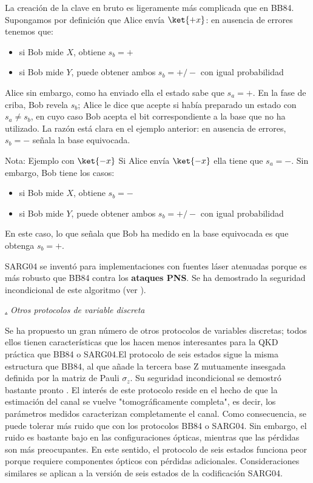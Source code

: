 \documentclass[a4paper,11pt]{book} %
\numberwithin{equation}{chapter}
\def\subsubiContadorIt{\par\addtocounter{subsubsection}{1}\underline{\it\thesubsubsection.}\hskip0.5cm \setcounter{subsubsubsectionIt}{0}}
\newcommand{\SubsubiIt}[1]{
		\subsubiContadorIt \textit{#1}
	}
\newcounter{subsubsubsectionIt}[subsubsection]
\begin{document}
La creación de la clave en bruto es ligeramente más complicada que en BB84. Supongamos por definición que Alice envía $\ket{+x}$: en ausencia de errores tenemos que:
\begin{itemize}
	\item si Bob mide $X$, obtiene $s_b = +$
	\item si Bob mide $Y$, puede obtener ambos $s_b= +/-$ con igual probabilidad
\end{itemize}  
Alice sin embargo, como ha enviado ella el estado sabe que $s_a = +$. En la fase de criba, Bob revela $s_b$; Alice le dice que acepte si había preparado un estado con $s_a \neq s_b$, en cuyo caso Bob acepta el bit correspondiente a la base que no ha utilizado. La razón está clara en el ejemplo anterior: en ausencia de errores, $s_b= -$ señala la base equivocada.

	\begin{mybox_blue}{Nota: Ejemplo con $\ket{-x}$}
	Si Alice envía $\ket{-x}$ ella tiene que $s_a = -$. Sin embargo, Bob tiene los casos:
	\begin{itemize}
		\item si Bob mide $X$, obtiene $s_b = -$
		\item si Bob mide $Y$, puede obtener ambos $s_b= +/-$ con igual probabilidad
	\end{itemize} 
	En este caso, lo que señala que Bob ha medido en la base equivocada es que obtenga $s_b = +$.
	\end{mybox_blue}

SARG04 se inventó para implementaciones con fuentes láser atenuadas porque es más robusto que BB84 contra los \textbf{ataques PNS}. Se ha demostrado la seguridad incondicional de este algoritmo (ver \cite{bib_QKD_resumen}).


			\SubsubiIt{Otros protocolos de variable discreta}

Se ha propuesto un gran número de otros protocolos de variables discretas; todos ellos tienen características que los hacen menos interesantes para la QKD práctica que BB84 o SARG04.El protocolo de seis estados \cite{bib_QKD_Six_state_2,bib_QKD_Six_state_3} sigue la misma estructura que BB84, al que añade la tercera base Z mutuamente insesgada definida por la matriz de Pauli $\sigma_z$. Su seguridad incondicional se demostró bastante pronto \cite{bib_QKD_Six_state_lo2001proof}. El interés de este protocolo reside en el hecho de que la estimación del canal se vuelve "tomográficamente completa", es decir, los parámetros medidos caracterizan completamente el canal. Como consecuencia, se puede tolerar más ruido que con los protocolos BB84 o SARG04. Sin embargo, el ruido es bastante bajo en las configuraciones ópticas, mientras que las pérdidas son más preocupantes. En este sentido, el protocolo de seis estados funciona peor porque requiere componentes ópticos con pérdidas adicionales. Consideraciones similares se aplican a la versión de seis estados de la codificación SARG04.
\end{document}
